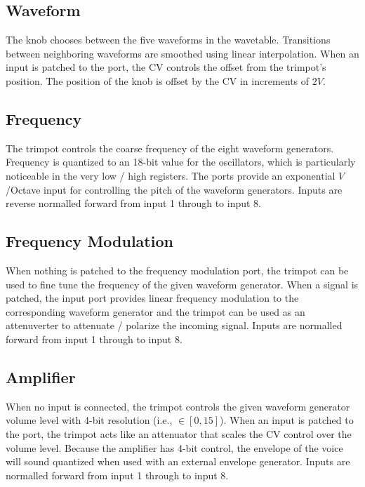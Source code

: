 \documentclass[12pt,letter]{article}
\begin{document}
\subsection{Waveform}

The knob chooses between the five waveforms in the wavetable. Transitions between neighboring waveforms are smoothed using linear interpolation. When an input is patched to the port, the CV controls the offset from the trimpot's position. The position of the knob is offset by the CV in increments of $2V$.

\subsection{Frequency}

The trimpot controls the coarse frequency of the eight waveform generators. Frequency is quantized to an 18-bit value for the oscillators, which is particularly noticeable in the very low / high registers. The ports provide an exponential $V$/Octave input for controlling the pitch of the waveform generators. Inputs are reverse normalled forward from input 1 through to input 8.

\subsection{Frequency Modulation}

When nothing is patched to the frequency modulation port, the trimpot can be used to fine tune the frequency of the given waveform generator. When a signal is patched, the input port provides linear frequency modulation to the corresponding waveform generator and the trimpot can be used as an attenuverter to attenuate / polarize the incoming signal. Inputs are normalled forward from input 1 through to input 8.

\subsection{Amplifier}

When no input is connected, the trimpot controls the given waveform generator volume level with 4-bit resolution (i.e., $\in [0, 15]$). When an input is patched to the port, the trimpot acts like an attenuator that scales the CV control over the volume level. Because the amplifier has 4-bit control, the envelope of the voice will sound quantized when used with an external envelope generator. Inputs are normalled forward from input 1 through to input 8.
\end{document}
